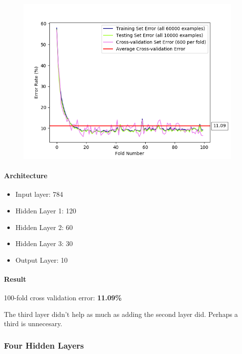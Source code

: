 \documentclass[11pt]{article}
\makeatletter
\def\maxwidth{\ifdim\Gin@nat@width>\linewidth\linewidth
    \else\Gin@nat@width\fi}
\let\Oldincludegraphics\includegraphics
\renewcommand{\includegraphics}[1]{\Oldincludegraphics[width=.8\maxwidth]{#1}}
\providecommand{\tightlist}{%
      \setlength{\itemsep}{0pt}\setlength{\parskip}{0pt}}
\makeatother
\begin{document}
\begin{figure}[htbp]
\centering
\includegraphics{plots/ff-numlayers-120-60-30.png}
\end{figure}

\paragraph{Architecture}\label{architecture-3}

\begin{itemize}
\tightlist
\item
  Input layer: 784
\item
  Hidden Layer 1: 120
\item
  Hidden Layer 2: 60
\item
  Hidden Layer 3: 30
\item
  Output Layer: 10
\end{itemize}

\paragraph{Result}\label{result-2}

100-fold cross validation error: \textbf{11.09\%}

The third layer didn't help as much as adding the second layer did.
Perhaps a third is unnecesary.

\pagebreak

\subsubsection{Four Hidden Layers}\label{four-hidden-layers}
\end{document}
